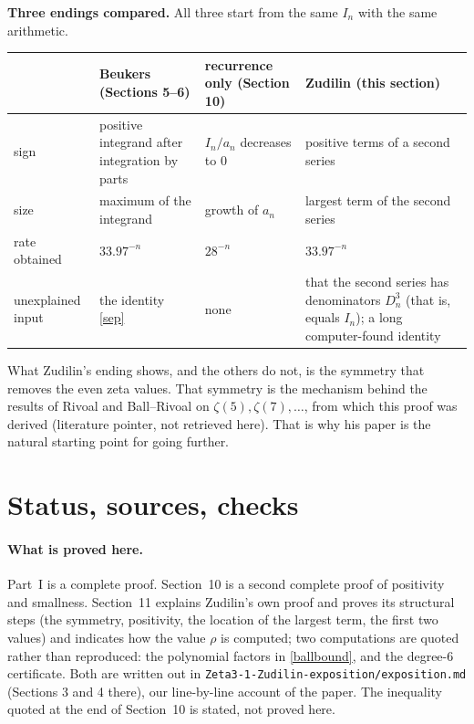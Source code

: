 \documentclass[11pt]{article}
\theoremstyle{remark}
\newcommand{\q}[1]{\medskip\noindent\textbf{#1}}
\begin{document}
\q{Three endings compared.} All three start from the same $I_n$ with the same arithmetic.
\begin{center}\small
\begin{tabular}{@{}p{30mm}p{37mm}p{37mm}p{37mm}@{}}
\toprule
 & Beukers (Sections 5--6) & recurrence only (Section 10) & Zudilin (this section)\\
\midrule
sign & positive integrand after integration by parts & $I_n/a_n$ decreases to $0$ & positive
terms of a second series\\
size & maximum of the integrand & growth of $a_n$ & largest term of the second series\\
rate obtained & $33.97^{-n}$ & $28^{-n}$ & $33.97^{-n}$\\
unexplained input & the identity \eqref{sep} & none & that the second series has denominators
$D_n^3$ (that is, equals $I_n$); a long computer-found identity\\
\bottomrule
\end{tabular}
\end{center}
What Zudilin's ending shows, and the others do not, is the symmetry that removes the even zeta
values. That symmetry is the mechanism behind the results of Rivoal and Ball--Rivoal on
$\zeta(5),\zeta(7),\dots$, from which this proof was derived (literature pointer, not retrieved
here). That is why his paper is the natural starting point for going further.

\section{Status, sources, checks}

\paragraph{What is proved here.} Part~I is a complete proof. Section~10 is a second complete
proof of positivity and smallness. Section~11 explains Zudilin's own proof and proves its
structural steps (the symmetry, positivity, the location of the largest term, the first two
values) and indicates how the value $\rho$ is computed; two computations are quoted rather than reproduced: the polynomial factors in
\eqref{ballbound}, and the degree-$6$ certificate. Both are written out in
\texttt{Zeta3-1-Zudilin-exposition/exposition.md} (Sections 3 and 4 there), our line-by-line
account of the paper. The inequality quoted at the end of Section~10 is stated, not proved here.
\end{document}
